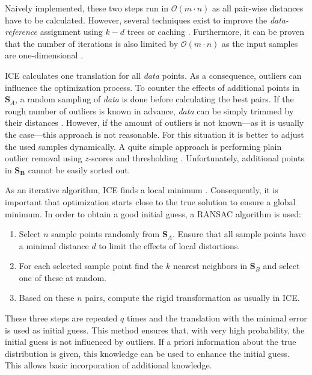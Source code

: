 \documentclass[conference]{IEEEtran}
\theoremstyle{examplestyle}
\begin{document}
Naively implemented, these two steps run in \(\mathcal{O}(m \cdot n)\) as all pair-wise distances have to be calculated. However, several techniques exist to improve the \textit{data-reference} assignment using \(k-d\) trees or caching \cite{Pomerleau2015}. Furthermore, it can be proven that the number of iterations is also limited by \(\mathcal{O}(m \cdot n)\) as the input samples are one-dimensional \cite{Ezra2008}.

\ac{ICE} calculates one translation for all \textit{data} points. As a consequence, outliers can influence the optimization process. To counter the effects of additional points in \(\pmb{S}_A\), a random sampling of \textit{data} is done before calculating the best pairs. If the rough number of outliers is known in advance, \textit{data} can be simply trimmed by their distances \cite{Chetverikov2002}. However, if the amount of outliers is not known---as it is usually the case---this approach is not reasonable. For this situation it is better to adjust the used samples dynamically. A quite simple approach is performing plain outlier removal using \(z\)-scores and thresholding \cite{Phillips2007}. Unfortunately, additional points in \(\pmb{S_B}\) cannot be easily sorted out.


As an iterative algorithm, \ac{ICE} finds a local minimum \cite{Do2008}. Consequently, it is important that optimization starts close to the true solution to ensure a global minimum. In order to obtain a good initial guess, a \ac{RANSAC} \cite{Fischler1981} algorithm is used:
\begin{enumerate}
	\item Select \(n\) sample points randomly from \(\pmb{S}_A\). Ensure that all sample points have a minimal distance \(d\) to limit the effects of local distortions.
	\item For each selected sample point find the \(k\) nearest neighbors in \(\pmb{S}_B\) and select one of these at random.
	\item Based on these \(n\) pairs, compute the rigid transformation as usually in \ac{ICE}.
\end{enumerate}

These three steps are repeated \(q\) times and the translation with the minimal error is used as initial guess. This method ensures that, with very high probability, the initial guess is not influenced by outliers. If a priori information about the true distribution is given, this knowledge can be used to enhance the initial guess. This allows basic incorporation of additional knowledge.
\end{document}
